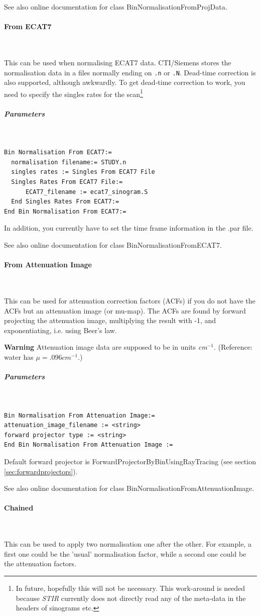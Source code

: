 \documentclass{article}
\newcommand{\subsubsubsection}[1]{\paragraph{#1}\mbox{} \\}
\newcommand{\subsubsubsubsection}[1]{\subparagraph{#1} \mbox{} \\}
\begin{document}
{{{{{{See also online documentation for class BinNormalisationFromProjData.

{ \subsubsubsection{From ECAT7}
}
This can be used when normalising ECAT7 data. CTI/Siemens stores
the normalisation data in a files normally ending on
\texttt{.n} or \texttt{.N}. Dead-time correction is also
supported, although awkwardly. To get dead-time correction
to work, you need to specify the singles rates for the 
scan\footnote{In future, hopefully this will not be necessary.
This work-around is needed because \textit{STIR} currently does not
directly read any of the meta-data in the headers of sinograms etc.}
{ \subsubsubsubsection{Parameters}
}
\begin{verbatim}
Bin Normalisation From ECAT7:=
  normalisation filename:= STUDY.n
  singles rates := Singles From ECAT7 File
  Singles Rates From ECAT7 File:=
      ECAT7_filename := ecat7_sinogram.S
  End Singles Rates From ECAT7:=
End Bin Normalisation From ECAT7:=
\end{verbatim}

In addition, you currently have to set the time frame information in the .par file.

See also online documentation for class BinNormalisationFromECAT7.

{ \subsubsubsection{From Attenuation Image}
}
\label{sec:binnormalisationfromattenuationimage}
This can be used for attenuation correction factors (ACFs) if 
you do not have the ACFs but an attenuation image (or mu-map). 
The ACFs are found by forward projecting the attenuation image, 
multiplying the result with -1, and exponentiating, i.e. using 
Beer's law.



\textbf{Warning} Attenuation image data are supposed to be in units \textit{cm}$^{-1}$. 
(Reference: water has $\mu=.096 \mathit{cm}^{-1}$.)

{ \subsubsubsubsection{Parameters}
}
\begin{verbatim}
Bin Normalisation From Attenuation Image:=
attenuation_image_filename := <string>
forward projector type := <string>
End Bin Normalisation From Attenuation Image :=
\end{verbatim}


Default forward projector is ForwardProjectorByBinUsingRayTracing 
(see section \ref{sec:forwardprojectors}).


See also online documentation for class BinNormalisationFromAttenuationImage.

{ \subsubsubsection{Chained }
}
\label{sec:chainedbinnormalisation}
This can be used to apply two normalisation one after the other. 
For example, a first one could be the 'usual' normalisation factor, 
while a second one could be the attenuation factors.

}}}}}}
\end{document}
